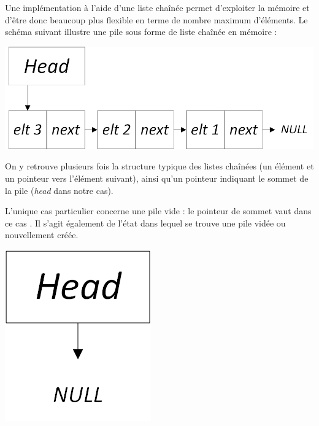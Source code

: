 \bigskip

Une implémentation à l'aide d'une liste chaînée permet d'exploiter la mémoire et d'être donc beaucoup plus flexible en terme de nombre maximum d'éléments.
Le schéma suivant illustre une pile sous forme de liste chaînée en mémoire :\\

\begin{center}
\includegraphics[scale=0.75]{Cours/Piles_3_Liste_Chainee_Structure_cas_general.png}
\end{center}

\smallskip

On y retrouve plusieurs fois la structure typique des listes chaînées (un élément et un pointeur vers l'élément suivant), ainsi qu'un pointeur indiquant le sommet de la pile (\textit{head} dans notre cas).

L'unique cas particulier concerne une pile vide : le pointeur de sommet vaut dans ce cas .
Il s'agit également de l'état dans lequel se trouve une pile vidée ou nouvellement créée.\\

\begin{center}
\includegraphics[scale=0.75]{Cours/Piles_3_Liste_Chainee_Structure_cas_vide.png}
\end{center}

\smallskip

